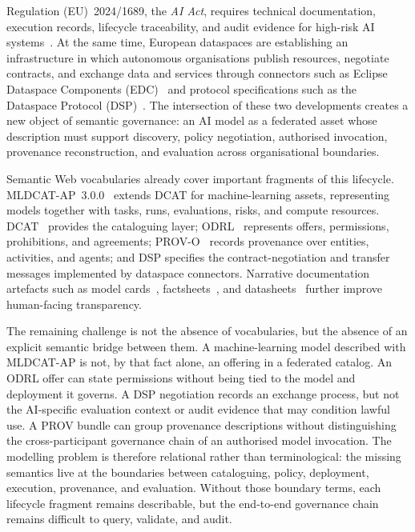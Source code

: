 \documentclass[Afour,sagev,times]{sagej}
\begin{document}
Regulation (EU)~2024/1689, the \emph{AI Act}, requires technical documentation, execution records, lifecycle traceability, and audit evidence for high-risk AI systems~\cite{aiact}. At the same time, European dataspaces are establishing an infrastructure in which autonomous organisations publish resources, negotiate contracts, and exchange data and services through connectors such as Eclipse Dataspace Components (EDC)~\cite{edc} and protocol specifications such as the Dataspace Protocol (DSP)~\cite{dsp}. The intersection of these two developments creates a new object of semantic governance: an AI model as a federated asset whose description must support discovery, policy negotiation, authorised invocation, provenance reconstruction, and evaluation across organisational boundaries.

Semantic Web vocabularies already cover important fragments of this lifecycle. MLDCAT-AP~3.0.0~\cite{mldcatap} extends DCAT for machine-learning assets, representing models together with tasks, runs, evaluations, risks, and compute resources. DCAT~\cite{dcat2} provides the cataloguing layer; ODRL~\cite{odrl22} represents offers, permissions, prohibitions, and agreements; PROV-O~\cite{provo} records provenance over entities, activities, and agents; and DSP specifies the contract-negotiation and transfer messages implemented by dataspace connectors. Narrative documentation artefacts such as model cards~\cite{mitchell19}, factsheets~\cite{arnold19}, and datasheets~\cite{gebru21} further improve human-facing transparency.

The remaining challenge is not the absence of vocabularies, but the absence of an explicit semantic bridge between them. A machine-learning model described with MLDCAT-AP is not, by that fact alone, an offering in a federated catalog. An ODRL offer can state permissions without being tied to the model and deployment it governs. A DSP negotiation records an exchange process, but not the AI-specific evaluation context or audit evidence that may condition lawful use. A PROV bundle can group provenance descriptions without distinguishing the cross-participant governance chain of an authorised model invocation. The modelling problem is therefore relational rather than terminological: the missing semantics live at the boundaries between cataloguing, policy, deployment, execution, provenance, and evaluation. Without those boundary terms, each lifecycle fragment remains describable, but the end-to-end governance chain remains difficult to query, validate, and audit.
\end{document}
